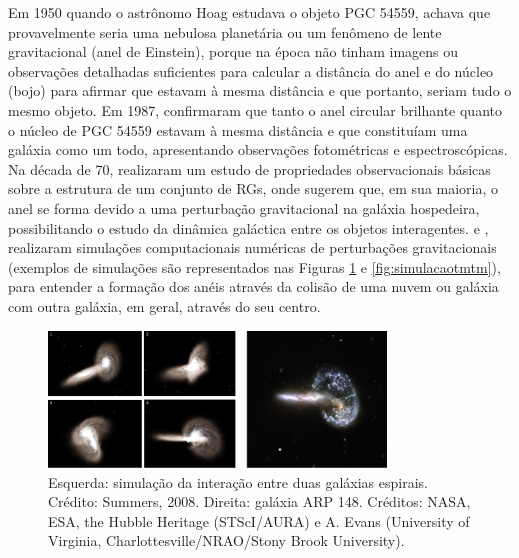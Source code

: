 Em 1950 quando o astrônomo Hoag estudava o objeto PGC 54559, achava que provavelmente seria uma nebulosa planetária ou um fenômeno de lente gravitacional (anel de Einstein), porque na época não tinham imagens ou observações detalhadas suficientes para calcular a distância do anel e do núcleo (bojo) para afirmar que estavam à mesma distância e que portanto, seriam tudo o mesmo objeto. Em 1987,  confirmaram que tanto o anel circular brilhante quanto o núcleo de PGC 54559 estavam à mesma distância e que constituíam uma galáxia como um todo, apresentando observações fotométricas e espectroscópicas. Na década de 70,  realizaram um estudo de propriedades observacionais básicas sobre a estrutura de um conjunto de RGs, onde sugerem que, em sua maioria, o anel se forma devido a uma perturbação gravitacional na galáxia hospedeira, possibilitando o estudo da dinâmica galáctica entre os objetos interagentes.  e , realizaram simulações computacionais numéricas de perturbações gravitacionais (exemplos de simulações são representados nas Figuras \ref{fig:simulacao} e \ref{fig:simulacaotmtm}), para entender a formação dos anéis através da colisão de uma nuvem ou galáxia com outra galáxia, em geral, através do seu centro.

\begin{figure}[h]
  \centering 
  \includegraphics[width=0.8\textwidth]{Imagens/simuvsobs.png} 
  \caption[Simulação vs. Observação.]{Esquerda: simulação da interação entre duas galáxias espirais. Crédito: Summers, 2008. Direita: galáxia ARP 148. Créditos: NASA, ESA, the Hubble Heritage (STScI/AURA) e A. Evans (University of Virginia, Charlottesville/NRAO/Stony Brook University).}
  \label{fig:simulacao} 
\end{figure}

